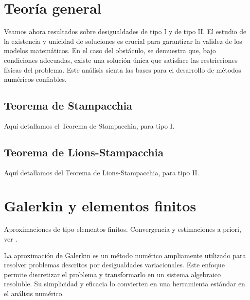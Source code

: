 \documentclass[12pt]{book}
\theoremstyle{definition}
\theoremstyle{plain}
\theoremstyle{remark}
\begin{document}
\section{Teoría general}

Veamos ahora resultados sobre desigualdades de tipo I y de tipo II.
El estudio de la existencia y unicidad de soluciones es crucial para garantizar la validez de los modelos matemáticos. En el caso del obstáculo, se demuestra que, bajo condiciones adecuadas, existe una solución única que satisface las restricciones físicas del problema. Este análisis sienta las bases para el desarrollo de métodos numéricos confiables.



\subsection{Teorema de Stampacchia}

Aquí detallamos el Teorema de Stampacchia, para tipo I.

\subsection{Teorema de Lions-Stampacchia}

Aquí detallamos del Teorema de Lions-Stampacchia, para tipo II.

\section{Galerkin y elementos finitos}

Aproximaciones de tipo elementos finitos. Convergencia y estimaciones a priori, ver \cite{glowinski80}.


%
%
%
La aproximación de Galerkin es un método numérico ampliamente utilizado para resolver problemas descritos por desigualdades variacionales. Este enfoque permite discretizar el problema y transformarlo en un sistema algebraico resoluble. Su simplicidad y eficacia lo convierten en una herramienta estándar en el análisis numérico.
\end{document}
